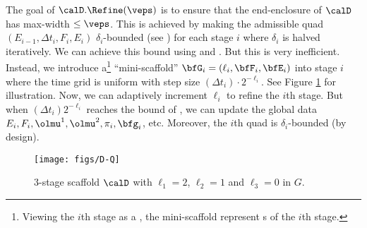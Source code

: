 	The goal of $\calD.\Refine(\veps)$ is to ensure that
	the end-enclosure of $\calD$ has max-width $\le \veps$.
	This is achieved by making the admissible quad
			$(E_{i-1},\Delta t_i, F_i, E_i)$
	$\delta_i$-bounded (see )
	for each stage $i$ where $\delta_i$ is halved
	iteratively. We can achieve this bound using
	 and .  But this is very inefficient.
	Instead, we introduce a\footnote{
		Viewing the $i$th stage as a \bigStep,
		the mini-scaffold represent \smallStep s of 
		the $i$th stage. 
	} 
	``mini-scaffold'' $\bfG_i=(\ell_i, \bfF_i,\bfE_i)$
	into stage $i$ where the time grid is uniform
	with step size $(\Delta t_i)\cdot 2^{-\ell_i}$.
	See Figure \ref{fig:d-q} for illustration.
	Now, we can adaptively increment $\ell_i$ to refine the
	$i$th stage.
	But when $(\Delta t_i)2^{-\ell_i}$ reaches the bound
	of , we can update the global data
	$E_i, F_i, \olmu^1, \olmu^2, \pi_i, \bfg_i$, etc.
	Moreover, the $i$th quad is $\delta_i$-bounded
	(by design).
	

	
	\begin{figure}[h]
		\centering
		\texttt{[image: figs/D-Q]}
		\caption{$3$-stage scaffold $\calD$ with $\ell_1=2$,
		$\ell_2=1$ and $\ell_3=0$ in $G$.}
		\label{fig:d-q}
	\end{figure}




